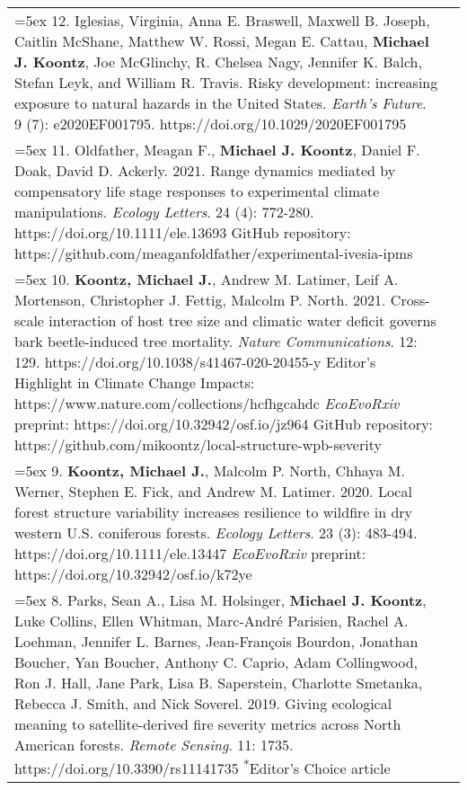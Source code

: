 \begin{longtable}{@{} >{\raggedright}p{6.25in} >{\raggedleft}X @{}}

\hangindent=5ex 12. Iglesias, Virginia, Anna E. Braswell, Maxwell B. Joseph, Caitlin McShane, Matthew W. Rossi, Megan E. Cattau, \textbf{Michael J. Koontz}, Joe McGlinchy, R. Chelsea Nagy, Jennifer K. Balch, Stefan Leyk, and William R. Travis. Risky development: increasing exposure to natural hazards in the United States. \emph{Earth's Future}. 9 (7): e2020EF001795. https://doi.org/10.1029/2020EF001795 & \tabularnewline

\hangindent=5ex 11. Oldfather, Meagan F., \textbf{Michael J. Koontz}, Daniel F. Doak, David D. Ackerly. 2021. Range dynamics mediated by compensatory life stage responses to experimental climate manipulations. \emph{Ecology Letters}. 24 (4): 772-280. https://doi.org/10.1111/ele.13693
\newline GitHub repository: https://github.com/meaganfoldfather/experimental-ivesia-ipms & \tabularnewline

\hangindent=5ex 10. \textbf{Koontz, Michael J.}, Andrew M. Latimer, Leif A. Mortenson, Christopher J. Fettig, Malcolm P. North. 2021. Cross-scale interaction of host tree size and climatic water deficit governs bark beetle-induced tree mortality. \emph{Nature Communications}. 12: 129. https://doi.org/10.1038/s41467-020-20455-y
\newline *Editor's Highlight in Climate Change Impacts: https://www.nature.com/collections/hcfhgcahdc
\newline \emph{EcoEvoRxiv} preprint: https://doi.org/10.32942/osf.io/jz964
\newline GitHub repository: https://github.com/mikoontz/local-structure-wpb-severity & \tabularnewline

\hangindent=5ex 9. \textbf{Koontz, Michael J.}, Malcolm P. North, Chhaya M. Werner, Stephen E. Fick, and Andrew M. Latimer. 2020. Local forest structure variability increases resilience to wildfire in dry western U.S. coniferous forests. \emph{Ecology Letters}. 23 (3): 483-494. https://doi.org/10.1111/ele.13447 \newline \emph{EcoEvoRxiv} preprint: https://doi.org/10.32942/osf.io/k72ye & \tabularnewline

\hangindent=5ex 8. Parks, Sean A., Lisa M. Holsinger, \textbf{Michael J. Koontz}, Luke Collins, Ellen Whitman, Marc-Andr\'e Parisien, Rachel A. Loehman, Jennifer L. Barnes, Jean-Fran\c{c}ois Bourdon, Jonathan Boucher, Yan Boucher, Anthony C. Caprio, Adam Collingwood, Ron J. Hall, Jane Park, Lisa B. Saperstein, Charlotte Smetanka, Rebecca J. Smith, and Nick Soverel. 2019. Giving ecological meaning to satellite-derived fire severity metrics across North American forests. \emph{Remote Sensing}. 11: 1735. https://doi.org/10.3390/rs11141735 \newline \textsuperscript{*}Editor's Choice article & \tabularnewline


\end{longtable}

